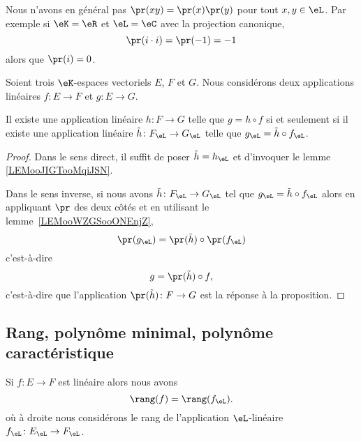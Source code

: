 \begin{remark}
	Nous n'avons en général pas \( \pr(xy)=\pr(x)\pr(y)\) pour tout \( x,y\in \eL\). Par exemple si \( \eK=\eR\) et \( \eL=\eC\) avec la projection canonique,
	\begin{equation}
		\pr(i\cdot i)=\pr(-1)=-1
	\end{equation}
	alors que \( \pr(i)=0\).
\end{remark}

\begin{proposition}     \label{PROPooHJJCooTXlzdH}
	Soient trois \( \eK\)-espaces vectoriels \( E\), \( F\) et \( G\). Nous considérons deux applications linéaires \( f\colon E\to F\) et \( g\colon E\to G\).

	Il existe une application linéaire \( h\colon F\to G\) telle que \( g=h\circ f\) si et seulement si il existe une application linéaire \( \tilde h\colon F_{\eL}\to G_{\eL}\) telle que \(   g_{\eL}=\tilde h\circ f_{\eL}   \).
\end{proposition}

\begin{proof}
	Dans le sens direct, il suffit de poser \( \tilde h=h_{\eL}\) et d'invoquer le lemme \ref{LEMooJIGTooMqiJSN}.

	Dans le sens inverse, si nous avons \( \tilde h\colon F_{\eL}\to G_{\eL}\) tel que \(   g_{\eL}=\tilde h\circ f_{\eL}  \) alors en appliquant \( \pr\) des deux côtés et en utilisant le lemme~\ref{LEMooWZGSooONEnjZ},
	\begin{equation}
		\pr(g_{\eL})=\pr(\tilde h)\circ\pr(f_{\eL})
	\end{equation}
	c'est-à-dire
	\begin{equation}
		g=\pr(\tilde h)\circ f,
	\end{equation}
	c'est-à-dire que l'application \( \pr(\tilde h)\colon F\to G\) est la réponse à la proposition.
\end{proof}

\subsection{Rang, polynôme minimal, polynôme caractéristique}

\begin{proposition}     \label{PROPooJFQDooZSsxMf}
	Si \( f\colon E\to F\) est linéaire alors nous avons
	\begin{equation}
		\rang(f)=\rang(f_{\eL}).
	\end{equation}
	où à droite nous considérons le rang de l'application \( \eL\)-linéaire \( f_{\eL}\colon E_{\eL}\to F_{\eL}\).
\end{proposition}

